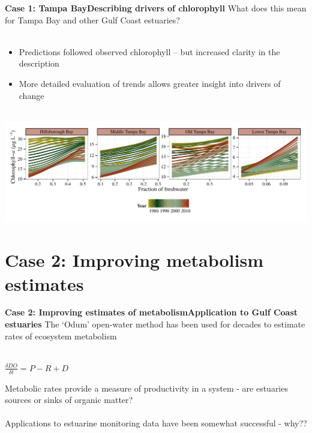 \documentclass[serif]{beamer}\usepackage[]{graphicx}\usepackage[]{color}
\begin{document}
\begin{frame}{\textbf{Case 1: Tampa Bay}}{\textbf{Describing drivers of chlorophyll}}
What does this mean for Tampa Bay and other Gulf Coast estuaries?\\~\\
\begin{itemize}
\item Predictions followed observed chlorophyll -- but increased clarity in the description
\item More detailed evaluation of trends allows greater insight into drivers of change\\~\\
\end{itemize}
\centerline{\includegraphics[width = \textwidth]{fig/title_plo2.pdf}}
\end{frame}

\section{Case 2: Improving metabolism estimates}

\begin{frame}{\textbf{Case 2: Improving estimates of metabolism}}{\textbf{Application to Gulf Coast estuaries}}
The `Odum' open-water method has been used for decades to estimate rates of ecosystem metabolism \scriptsize \cite{Odum56} \\~\\
\normalsize
\begin{center}
$\frac{\delta DO}{\delta t} = P - R + D$
\end{center}
Metabolic rates provide a measure of productivity in a system - are estuaries sources or sinks of organic matter? \scriptsize \cite{Caffrey14}
\normalsize \\~\\
Applications to estuarine monitoring data have been somewhat successful - why?? 
\end{frame}
\end{document}
